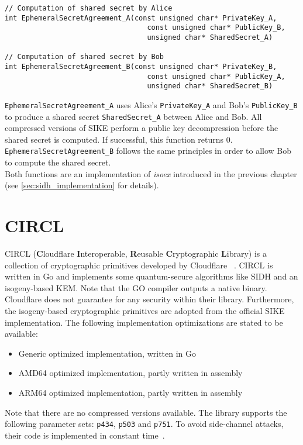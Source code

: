 \begin{lstlisting}[]
// Computation of shared secret by Alice
int EphemeralSecretAgreement_A(const unsigned char* PrivateKey_A, 
								  const unsigned char* PublicKey_B,
								  unsigned char* SharedSecret_A)
								  
// Computation of shared secret by Bob
int EphemeralSecretAgreement_B(const unsigned char* PrivateKey_B, 
								  const unsigned char* PublicKey_A,
								  unsigned char* SharedSecret_B)
\end{lstlisting}
\texttt{EphemeralSecretAgreement\_A} uses Alice's \texttt{PrivateKey\_A} and Bob's \texttt{PublicKey\_B} to produce a shared secret \texttt{SharedSecret\_A} between Alice and Bob. All compressed versions of \gls{SIKE} perform a public key decompression before the shared secret is computed. If successful, this function returns 0. \texttt{EphemeralSecretAgreement\_B} follows the same principles in order to allow Bob to compute the shared secret.\\
Both functions are an implementation of \textit{isoex} introduced in the previous chapter (see \autoref{sec:sidh_implementation} for details).

\section{\gls{CIRCL}} \label{sec:circl_description}

\gls{CIRCL} (\textbf{C}loudflare \textbf{I}nteroperable, \textbf{R}eusable \textbf{C}ryptographic \textbf{L}ibrary) is a collection of cryptographic primitives developed by Cloudflare ~\parencite{circl2020github}. \gls{CIRCL} is written in Go and implements some quantum-secure algorithms like \gls{SIDH} and an isogeny-based \gls{KEM}. Note that the GO compiler outputs a native binary.  Cloudflare does not guarantee for any security within their library. Furthermore, the isogeny-based cryptographic primitives are adopted from the official \gls{SIKE} implementation. The following implementation optimizations are stated to be available:

\begin{itemize}
  \item Generic optimized implementation, written in Go 
  \item AMD64 optimized implementation, partly written in assembly
  \item ARM64 optimized implementation, partly written in assembly
\end{itemize}
Note that there are no compressed versions available. The library supports the following parameter sets: \texttt{p434}, \texttt{p503} and \texttt{p751}. To avoid side-channel attacks, their code is implemented in constant time~\parencite{circl2019intro}.

